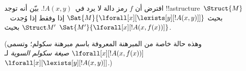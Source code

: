 \documentclass[../../../include/open-logic-section]{subfiles}
\begin{document}
\begin{prob}
افترض أن $f$ رمز دالة لا يرد في~$!A(x,y)$. بيّن أنه توجد
!!a{structure}~$\Struct{M}$ بحيث
$\Sat{M}{\lforall[x][\lexists[y][!A(x,y)]]}$ إذا وفقط إذا وُجدت
~$\Struct M'$ بحيث $\Sat{M'}{\lforall[x][!A(x,f(x))]}$.

(وهذه حالة خاصة من المبرهنة المعروفة باسم مبرهنة سكولم؛ وتسمى
$\lforall[x][!A(x,f(x))]$ \emph{صيغة سكولم السوية}
لـ~$\lforall[x][\lexists[y][!A(x,y)]]$.)
\end{prob}
\end{document}
